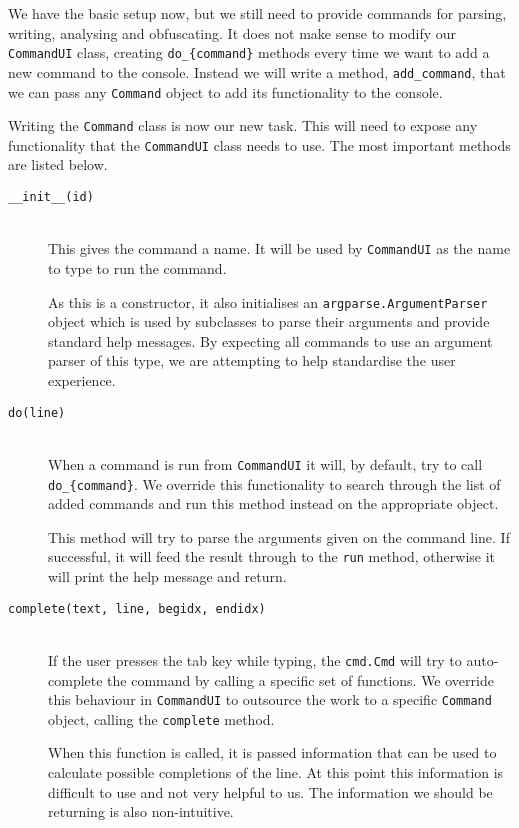\documentclass[twoside,a4paper]{report}
\begin{document}
We have the basic setup now, but we still need to provide commands for parsing, writing, analysing and obfuscating. It does not make sense to modify
our \texttt{CommandUI} class, creating \texttt{do\_\{command\}} methods every time we want to add a new command to the console. Instead we will write
a method, \texttt{add\_command}, that we can pass any \texttt{Command} object to add its functionality to the console.

Writing the \texttt{Command} class is now our new task. This will need to expose any functionality that the \texttt{CommandUI} class needs to use. The
most important methods are listed below.

\begin{description}
\item[\texttt{\_\_init\_\_(id)}] \hfill \\
This gives the command a name. It will be used by \texttt{CommandUI} as the name to type to run the command.

As this is a constructor, it also initialises an \texttt{argparse.ArgumentParser} object which is used by subclasses to parse their arguments and
provide standard help messages. By expecting all commands to use an argument parser of this type, we are attempting to help standardise the user
experience.

\item[\texttt{do(line)}] \hfill \\
When a command is run from \texttt{CommandUI} it will, by default, try to call \texttt{do\_\{command\}}. We override this functionality to search
through the list of added commands and run this method instead on the appropriate object.

This method will try to parse the arguments given on the command line. If successful, it will feed the result through to the \texttt{run} method,
otherwise it will print the help message and return.

\item[\texttt{complete(text, line, begidx, endidx)}] \hfill \\
If the user presses the tab key while typing, the \texttt{cmd.Cmd} will try to auto-complete the command by calling a specific set of functions. We
override this behaviour in \texttt{CommandUI} to outsource the work to a specific \texttt{Command} object, calling the \texttt{complete} method.

When this function is called, it is passed information that can be used to calculate possible completions of the line. At this point this information
is difficult to use and not very helpful to us. The information we should be returning is also non-intuitive.


\end{description}
\end{document}
